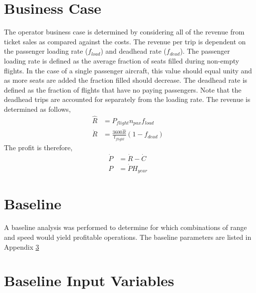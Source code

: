 \documentclass[12pt, letter]{article}
\begin{document}
\section{Business Case}
The operator business case is determined by considering all of the revenue from ticket sales as compared against the costs. The revenue per trip is dependent on the passenger loading rate ($f_{load}$) and deadhead rate ($f_{dead}$). The passenger loading rate is defined as the average fraction of seats filled during non-empty flights. In the case of a single passenger aircraft, this value should equal unity and as more seats are added the fraction filled should decrease. The deadhead rate is defined as the fraction of flights that have no paying passengers. Note that the deadhead trips are accounted for separately from the loading rate. The revenue is determined as follows,
\begin{align}
	\hat{R} &= P_{flight} n_{pax} f_{load} \\
	\dot{R} &= \frac{3600\hat{R}}{t_{flight}} \left(1-f_{dead}\right)
\end{align}
The profit is therefore,
\begin{align}
	\dot{P} &= \dot{R} - \dot{C}  \\
	P &= \dot{P} H_{year}
\end{align}
\section{Baseline}
A baseline analysis was performed to determine for which combinations of range and speed would yield profitable operations. The baseline parameters are listed in Appendix \ref{baseline}


\appendix
\section{Baseline Input Variables} \label{baseline}
\end{document}

